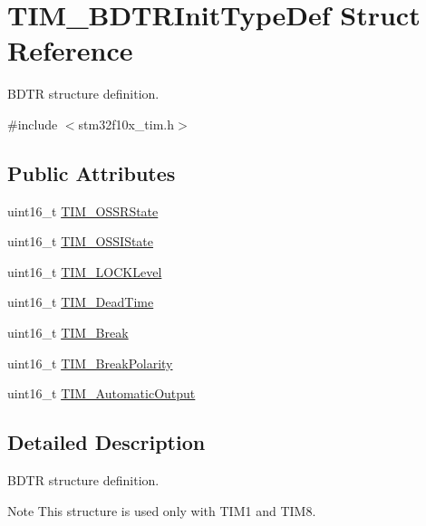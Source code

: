 \hypertarget{structTIM__BDTRInitTypeDef}{
\section{TIM\_\-BDTRInitTypeDef Struct Reference}
\label{structTIM__BDTRInitTypeDef}
}


BDTR structure definition.  




{\ttfamily \#include $<$stm32f10x\_\-tim.h$>$}

\subsection*{Public Attributes}
\begin{DoxyCompactItemize}
\item 
uint16\_\-t \hyperlink{structTIM__BDTRInitTypeDef_a8f34ad7bc4764bd3ff372cadde468072}{TIM\_\-OSSRState}
\item 
uint16\_\-t \hyperlink{structTIM__BDTRInitTypeDef_ad8891e3739a7db8a45343d4e2f9d2824}{TIM\_\-OSSIState}
\item 
uint16\_\-t \hyperlink{structTIM__BDTRInitTypeDef_aa5296a7b194d25b16899f6a98da01f03}{TIM\_\-LOCKLevel}
\item 
uint16\_\-t \hyperlink{structTIM__BDTRInitTypeDef_a01ccbaffccdb3068b8a60c912579b1a2}{TIM\_\-DeadTime}
\item 
uint16\_\-t \hyperlink{structTIM__BDTRInitTypeDef_a9fcf20632d0377727476a98f7183be56}{TIM\_\-Break}
\item 
uint16\_\-t \hyperlink{structTIM__BDTRInitTypeDef_a5731e4e786b66f35cfe4798d6157619e}{TIM\_\-BreakPolarity}
\item 
uint16\_\-t \hyperlink{structTIM__BDTRInitTypeDef_a6c056e29af67fd8a32919104ea48eea2}{TIM\_\-AutomaticOutput}
\end{DoxyCompactItemize}


\subsection{Detailed Description}
BDTR structure definition. \begin{DoxyNote}{Note}
This structure is used only with TIM1 and TIM8. 
\end{DoxyNote}


